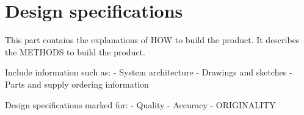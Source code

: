 \documentclass{article}
\begin{document}
\section{Design specifications}
This part contains the explanations of HOW to build the product. It describes the METHODS to build the product.

Include information such as:
- System architecture
- Drawings and sketches
- Parts and supply ordering information

Design specifications marked for:
- Quality
- Accuracy
- ORIGINALITY



% 

% 

% 
\end{document}
